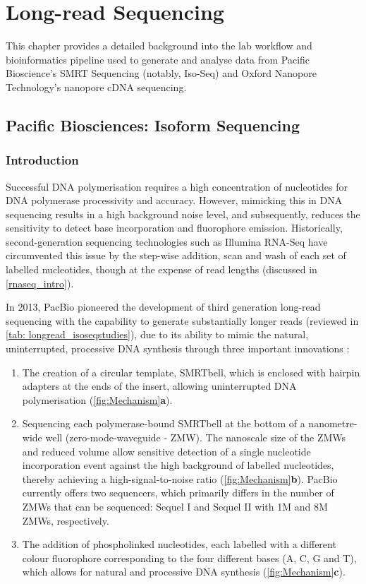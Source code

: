 \chapter{Long-read Sequencing}\label{ch: long_read_sequencing}

This chapter provides a detailed background into the lab workflow and bioinformatics pipeline used to generate and analyse data from Pacific Bioscience's SMRT Sequencing (notably, Iso-Seq) and Oxford Nanopore Technology's nanopore cDNA sequencing. 

\section{Pacific Biosciences: Isoform Sequencing}
\label{sec:pb_isoform_sequencing}

\subsection{Introduction}
Successful DNA polymerisation requires a high concentration of nucleotides for DNA polymerase processivity and accuracy. However, mimicking this in DNA sequencing results in a high background noise level, and subsequently, reduces the sensitivity to detect base incorporation and fluorophore emission. Historically, second-generation sequencing technologies such as Illumina RNA-Seq have circumvented this issue by the step-wise addition, scan and wash of each set of labelled nucleotides, though at the expense of read lengths (discussed in \cref{rnaseq_intro}). 

In 2013, PacBio pioneered the development of third generation long-read sequencing with the capability to generate substantially longer reads (reviewed in \cref{tab: longread_isoseqstudies}), due to its ability to mimic the natural, uninterrupted, processive DNA synthesis through three important innovations \cite{Eid2009}: 
\begin{enumerate}
	\item The creation of a circular template, SMRTbell, which is enclosed with hairpin adapters at the ends of the insert, allowing uninterrupted DNA polymerisation \cite{Travers2010} (\cref{fig:Mechanism}\textbf{a}).
	\item Sequencing each polymerase-bound SMRTbell at the bottom of a nanometre-wide well (zero-mode-waveguide - ZMW)\cite{Levene2003}. The nanoscale size of the ZMWs and reduced volume allow sensitive detection of a single nucleotide incorporation event against the high background of labelled nucleotides, thereby achieving a high-signal-to-noise ratio (\cref{fig:Mechanism}\textbf{b}). PacBio currently offers two sequencers, which primarily differs in the number of ZMWs that can be sequenced: Sequel I and Sequel II with 1M and 8M ZMWs, respectively.   
	\item The addition of phospholinked nucleotides, each labelled with a different colour fluorophore corresponding to the four different bases (A, C, G and T), which allows for natural and processive DNA synthesis\cite{Mccarthy2010} (\cref{fig:Mechanism}\textbf{c}). 
\end{enumerate}

